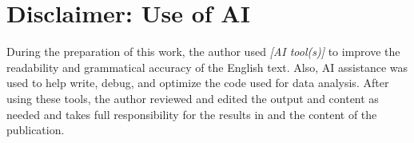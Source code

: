 \chapter{Disclaimer: Use of AI}\label{chapter:Appendix A}
\setcounter{page}{1}
During the preparation of this work, the author used \textit{[AI tool(s)]} to improve the readability and grammatical accuracy of the English text. Also, AI assistance was used to help write, debug, and optimize the code used for data analysis. After using these tools, the author reviewed and edited the output and content as needed and takes full responsibility for the results in and the content of the publication.
